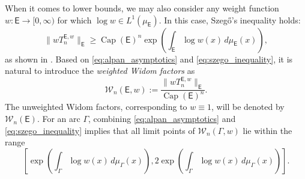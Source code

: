 \documentclass[12pt,oneside,reqno]{amsart}
\theoremstyle{definition}
\numberwithin{equation}{section}
\newcommand{\E}{{\mathsf E}}
\newcommand{\cW}{{\mathcal{W}}}
\renewcommand{\Cap}{\operatorname{Cap}}
\begin{document}
When it comes to lower bounds, we may also consider %
any weight function \( w: \E \to [0,\infty) \) for which \( \log w \in L^1(\mu_\E) \). In this case, Szeg\H{o}'s inequality holds:
\begin{equation}
\|wT_n^{\E,w}\|_{\E} \geq \Cap(\E)^n \exp\left(\int_{\E} \log w(x) \, d\mu_\E(x)\right),
\label{eq:szego_inequality}
\end{equation}
as shown in \cite[Theorem 13]{novello-schiefermayr-zinchenko21}. Based on \eqref{eq:alpan_asymptotics} and \eqref{eq:szego_inequality}, it is natural to introduce the \emph{weighted Widom factors} as
\begin{equation}
\mathcal{W}_n(\E,w) := \frac{\|wT_n^{\E,w}\|_{\E}}{\Cap(\E)^n}.
\label{eq:widom_factor}
\end{equation}
The unweighted Widom factors, corresponding to $w\equiv 1$, will be denoted by $\cW_n(\E)$. For an arc \( \Gamma \), combining \eqref{eq:alpan_asymptotics} and \eqref{eq:szego_inequality} implies that all limit points of \( \mathcal{W}_n(\Gamma,w) \) lie within the range
\begin{equation}
	\left[\exp\left(\int_{\Gamma} \log w(x) \, d\mu_{\Gamma}(x)\right), 2\exp\left(\int_{\Gamma} \log w(x) \, d\mu_{\Gamma}(x)\right)\right].
	\label{eq:upper_lower_bounds_widom_factors}
\end{equation}
\end{document}
